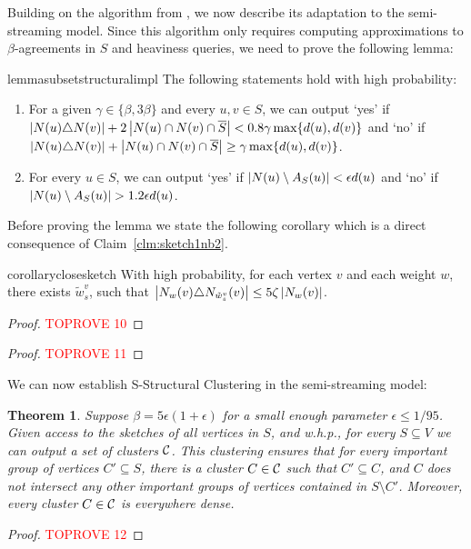 \documentclass{article}
\newtheorem{theorem}{Theorem}
\begin{document}
Building on the algorithm from , we now describe its adaptation to the semi-streaming model. Since this algorithm only requires computing approximations to $\beta$-agreements in $S$ and heaviness queries, we need to prove the following lemma:
\begin{restatable}{lemma}{subsetstructuralimpl}\label{lemma:subset_structural_impl}
The following statements hold with high probability:

\begin{enumerate}
    \item For a given $\gamma \in \{\beta, 3\beta\}$ and every $u,v \in S$, we can output `yes' if $\left|N(u)\triangle N(v)\right| + 2\left|N(u)\cap N(v)\cap \overline{S}\right| < 0.8\gamma \max\{d(u), d(v)\}$ and `no' if $\left|N(u)\triangle N(v)\right| + \left|N(u)\cap N(v)\cap \overline{S}\right| \geq \gamma \max\{d(u), d(v)\}$.
    \item For every $u \in S$, we can output `yes' if $\left|N(u) \setminus A_S(u)\right| < \epsilon d(u)$ and `no' if $\left|N(u) \setminus A_S(u)\right| > 1.2 \epsilon d(u)$.
\end{enumerate}
\end{restatable}

Before proving the lemma we state the following corollary which is a direct consequence of Claim~\ref{clm:sketch1nb2}.

\begin{restatable}{corollary}{closesketch}\label{coro:closesketch}
With high probability, for each vertex \(v\) and each weight $w$, there exists $\tilde{w}^v_s$, such that $\left|N_w(v) \triangle N_{\tilde{w}^v_s}(v)\right| \leq 5\zeta \left|N_w(v)\right|$.
\end{restatable}

\begin{proof}\textcolor{red}{TOPROVE 10}\end{proof}


\begin{proof}\textcolor{red}{TOPROVE 11}\end{proof}

We can now establish S-Structural Clustering in the semi-streaming model:
\begin{theorem} \label{lem:horizontal}
    Suppose $\beta = 5\epsilon(1+\epsilon)$ for a small enough parameter $\epsilon \leq 1/95$.
    Given access to the sketches of all vertices in $S$, and w.h.p.,
    for every $S \subseteq V$
    we can output a set of clusters $\mathcal{C}$. This clustering ensures that for every important group of vertices $C' \subseteq S$, there is a cluster $C \in \mathcal{C}$ such that $C' \subseteq C$, and $C$ does not intersect any other important groups of vertices contained in $S \setminus C'$. Moreover, every
    cluster $C \in \mathcal{C}$ is everywhere dense. 
\end{theorem}
\begin{proof}\textcolor{red}{TOPROVE 12}\end{proof}
\end{document}
